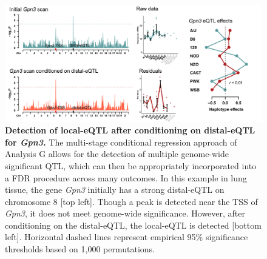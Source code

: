 \documentclass[10pt,letterpaper,twoside]{article}
\begin{document}
\begin{figure}[hp]
\renewcommand{\familydefault}{\sfdefault}\normalfont
\centering
\includegraphics[width=\textwidth, trim={0in 0in 0in 0in}, clip]{figs/gpn3_conditional_scan.png}
\caption{\textbf{Detection of local-eQTL after conditioning on distal-eQTL for \textit{Gpn3}.} 
The multi-stage conditional regression approach of Analysis G allows for the detection of multiple genome-wide significant QTL, which can then be appropriately incorporated into a FDR procedure across many outcomes. In this example in lung tissue, the gene \textit{Gpn3} initially has a strong distal-eQTL on chromosome 8 [top left]. Though a peak is detected near the TSS of \textit{Gpn3}, it does not meet genome-wide significance. However, after conditioning on the distal-eQTL, the local-eQTL is detected [bottom left]. Horizontal dashed lines represent empirical 95\% significance thresholds based on 1,000 permutations.
\label{fig:conditional_scans}}
\end{figure}
\end{document}
